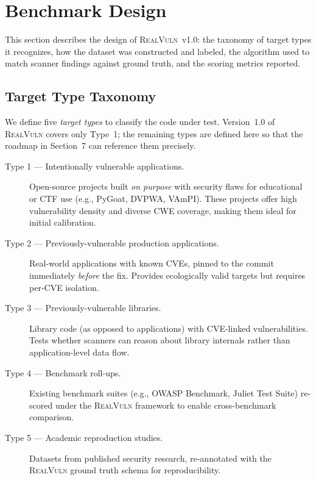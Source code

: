 \section{Benchmark Design}
\label{sec:benchmark-design}

This section describes the design of \textsc{RealVuln}~v1.0: the taxonomy of target types it recognizes, how the dataset was constructed and labeled, the algorithm used to match scanner findings against ground truth, and the scoring metrics reported.

\subsection{Target Type Taxonomy}
\label{sec:target-types}

We define five \emph{target types} to classify the code under test.
Version~1.0 of \textsc{RealVuln} covers only Type~1; the remaining types are defined here so that the roadmap in Section~7 can reference them precisely.

\begin{description}
  \item[Type 1 --- Intentionally vulnerable applications.]
    Open-source projects built \emph{on purpose} with security flaws for educational or CTF use (e.g., PyGoat, DVPWA, VAmPI).
    These projects offer high vulnerability density and diverse CWE coverage, making them ideal for initial calibration.
  \item[Type 2 --- Previously-vulnerable production applications.]
    Real-world applications with known CVEs, pinned to the commit immediately \emph{before} the fix.
    Provides ecologically valid targets but requires per-CVE isolation.
  \item[Type 3 --- Previously-vulnerable libraries.]
    Library code (as opposed to applications) with CVE-linked vulnerabilities.
    Tests whether scanners can reason about library internals rather than application-level data flow.
  \item[Type 4 --- Benchmark roll-ups.]
    Existing benchmark suites (e.g., OWASP Benchmark, Juliet Test Suite) re-scored under the \textsc{RealVuln} framework to enable cross-benchmark comparison.
  \item[Type 5 --- Academic reproduction studies.]
    Datasets from published security research, re-annotated with the \textsc{RealVuln} ground truth schema for reproducibility.
\end{description}

